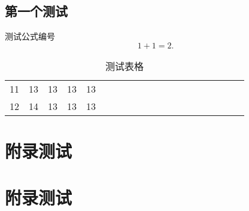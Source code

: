 \documentclass[forprint]{EdwardEssay}
\begin{document}
\section{第一个测试}
测试公式编号
\begin{equation}
  1+1=2.
\end{equation}


\begin{table}[h]
  \centering
  \caption{测试表格}
  \begin{tabular}{*{20}c}
    \hline
    11 & 13 & 13 & 13 & 13 \\
    12 & 14 & 13 & 13 & 13 \\
    \hline
  \end{tabular}
\end{table}


\chapter{附录测试}


\chapter{附录测试}


\cleardoublepage
\end{document}
